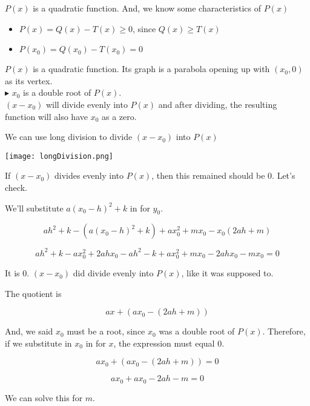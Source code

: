 \documentclass{ximera}
\begin{document}
$P(x)$ is a quadratic function.  And, we know some characteristics of $P(x)$



\begin{itemize}
\item $P(x) = Q(x) - T(x) \geq 0$, since $Q(x) \geq T(x)$
\item $P(x_0) = Q(x_0) - T(x_0) = 0$
\end{itemize}




$P(x)$ is a quadratic function.  Its graph is a parabola opening up with $(x_0, 0)$ as its vertex. \\


$\blacktriangleright$   $x_0$ is a double root of $P(x)$. \\


$(x - x_0)$ will divide evenly into $P(x)$ and after dividing, the resulting function will also have $x_0$ as a zero.



We can use long division to divide $(x - x_0)$ into $P(x)$



\begin{image}
\texttt{[image: longDivision.png]}
\end{image}


If $(x - x_0)$ divides evenly into $P(x)$, then this remained should be $0$.  Let's check.



We'll substitute $a (x_0 - h)^2 + k$ in for $y_0$.

\[
a h^2 + k - (a (x_0 - h)^2 + k) + a x_0^2 + m x_0 - x_0 (2 a h + m)
\]


\[
a h^2 + k - a x_0^2 + 2 a h x_0 - a h^2 - k + a x_0^2 + m x_0 - 2 a h x_0 - m x_0 = 0
\]


It is $0$.   $(x - x_0)$ did divide evenly into $P(x)$, like it was supposed to.

The quotient is 


\[
a x + (a x_0 - (2 a h + m))
\]

And, we said $x_0$ must be a root, since $x_0$ was a double root of $P(x)$.  Therefore, if we substitute in $x_0$ in for $x$, the expression must equal $0$.


\[
a x_0 + (a x_0 - (2 a h + m)) = 0
\]


\[
a x_0 + a x_0 - 2 a h - m = 0
\] 


We can solve this for $m$.
\end{document}
